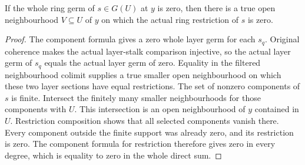\begin{lemma}
\label{hir:real-domain-actual-normal-associated-ring-zero-neighbourhood}
\leanok
If the whole ring germ of $s\in G(U)$ at $y$ is zero, then there is a
true open neighbourhood $V\subseteq U$ of $y$ on which the actual ring
restriction of $s$ is zero.
\end{lemma}
\begin{proof}
The component formula gives a zero whole layer germ for each $s_q$.
Original coherence makes the actual layer-stalk comparison injective,
so the actual layer germ of $s_q$ equals the actual layer germ of zero.
Equality in the filtered neighbourhood colimit supplies a true smaller
open neighbourhood on which these two layer sections have equal
restrictions. The set of nonzero components of $s$ is finite. Intersect
the finitely many smaller neighbourhoods for those components with
$U$. This intersection is an open neighbourhood of $y$ contained in
$U$. Restriction composition shows that all selected components vanish
there. Every component outside the finite support was already zero,
and its restriction is zero. The component formula for restriction
therefore gives zero in every degree, which is equality to zero in
the whole direct sum.
\end{proof}

